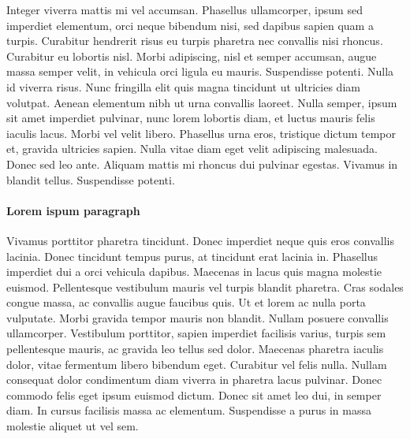 \documentclass[a4paper,parskip=half,oneside]{scrbook}
\begin{document}
Integer viverra mattis mi vel accumsan. Phasellus ullamcorper, ipsum sed imperdiet elementum, orci neque bibendum nisi, sed dapibus sapien quam a turpis. Curabitur hendrerit risus eu turpis pharetra nec convallis nisi rhoncus. Curabitur eu lobortis nisl. Morbi adipiscing, nisl et semper accumsan, augue massa semper velit, in vehicula orci ligula eu mauris. Suspendisse potenti. Nulla id viverra risus. Nunc fringilla elit quis magna tincidunt ut ultricies diam volutpat. Aenean elementum nibh ut urna convallis laoreet. Nulla semper, ipsum sit amet imperdiet pulvinar, nunc lorem lobortis diam, et luctus mauris felis iaculis lacus. Morbi vel velit libero. Phasellus urna eros, tristique dictum tempor et, gravida ultricies sapien. Nulla vitae diam eget velit adipiscing malesuada. Donec sed leo ante. Aliquam mattis mi rhoncus dui pulvinar egestas. Vivamus in blandit tellus. Suspendisse potenti.


\paragraph{Lorem ispum paragraph}
Vivamus porttitor pharetra tincidunt. Donec imperdiet neque quis eros convallis lacinia. Donec tincidunt tempus purus, at tincidunt erat lacinia in. Phasellus imperdiet dui a orci vehicula dapibus. Maecenas in lacus quis magna molestie euismod. Pellentesque vestibulum mauris vel turpis blandit pharetra. Cras sodales congue massa, ac convallis augue faucibus quis. Ut et lorem ac nulla porta vulputate. Morbi gravida tempor mauris non blandit. Nullam posuere convallis ullamcorper. Vestibulum porttitor, sapien imperdiet facilisis varius, turpis sem pellentesque mauris, ac gravida leo tellus sed dolor. Maecenas pharetra iaculis dolor, vitae fermentum libero bibendum eget. Curabitur vel felis nulla. Nullam consequat dolor condimentum diam viverra in pharetra lacus pulvinar. Donec commodo felis eget ipsum euismod dictum. Donec sit amet leo dui, in semper diam. In cursus facilisis massa ac elementum. Suspendisse a purus in massa molestie aliquet ut vel sem.
\end{document}
